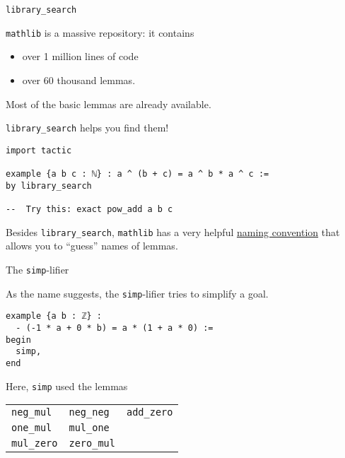 \documentclass{beamer}
\begin{document}
\begin{frame}[fragile]{{\texttt{library\_search}}}

{\verb`mathlib`} is a massive repository: it contains
\begin{itemize}
\item
  over 1 million lines of code
\item
  over 60 thousand lemmas.
\end{itemize}

Most of the basic{\footnotemark} lemmas are already available.
\bigskip

{\verb`library_search`} helps you find them!

\end{frame}

\begin{frame}[fragile]

\begin{verbatim}
import tactic

example {a b c : ℕ} : a ^ (b + c) = a ^ b * a ^ c :=
by library_search

--  Try this: exact pow_add a b c
\end{verbatim}
\bigskip

Besides {\verb`library_search`}, {\verb`mathlib`} has a very helpful \href{https://leanprover-community.github.io/contribute/naming.html}{naming convention} that allows you to ``guess'' names of lemmas.
\bigskip
\end{frame}

\begin{frame}[fragile]{The {\texttt{simp}}-lifier}

As the name suggests, the {\verb`simp`}-lifier tries to simplify a goal.

\begin{verbatim}
example {a b : ℤ} :
  - (-1 * a + 0 * b) = a * (1 + a * 0) :=
begin
  simp,
end
\end{verbatim}
\bigskip

Here, {\verb`simp`} used the lemmas
\bigskip

\begin{tabular}{|l|l|l|}
\hline
{\verb`neg_mul`} & {\verb`neg_neg`} & {\verb`add_zero`} \\
{\verb`one_mul`} & {\verb`mul_one`} &\\
{\verb`mul_zero`} & {\verb`zero_mul`} &\\
\hline
\end{tabular}

\end{frame}
\end{document}
